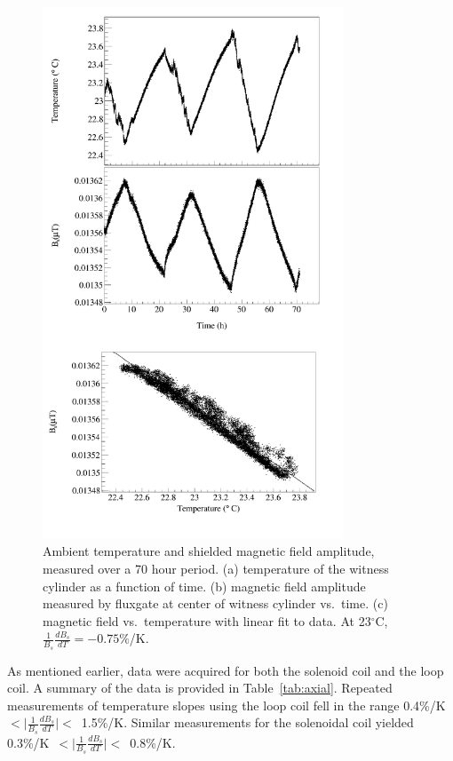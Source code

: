 \begin{figure}
  \begin{center}
    \includegraphics[width=0.8\textwidth]{Axial_graph-crop.pdf}
    \caption{Ambient temperature and shielded magnetic field
      amplitude, measured over a 70 hour period. (a) temperature of
      the witness cylinder as a function of time.  (b) magnetic field
      amplitude measured by fluxgate at center of witness cylinder
      vs.~time.  (c) magnetic field vs.~temperature with linear fit to
      data. At 23$^\circ$C, $\frac{1}{B_s}\frac{dB_s}{dT}=-0.75\%$/K.}
    \label{fig:B_vs_Temp}
  \end{center}
\end{figure} 

As mentioned earlier, data were acquired for both the solenoid coil
and the loop coil.  A summary of the data is provided in
Table~\ref{tab:axial}.  Repeated measurements of temperature slopes
using the loop coil fell in the range
0.4\%/K~$<\vert\frac{1}{B_s}\frac{dB_s}{dT}\vert<$~1.5\%/K.  Similar
measurements for the solenoidal coil yielded
0.3\%/K~$<\vert\frac{1}{B_s}\frac{dB_s}{dT}\vert<$~0.8\%/K.

